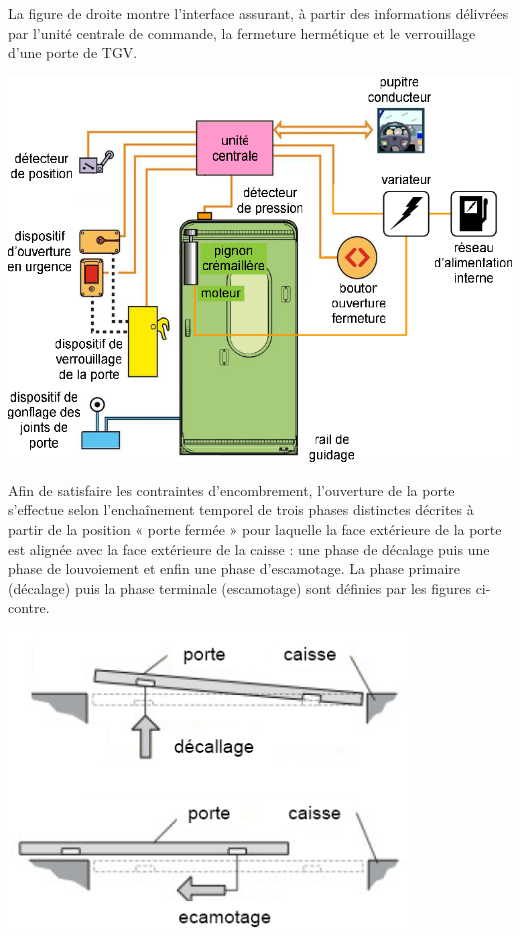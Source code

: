 \documentclass[10pt,fleqn]{article} %
\begin{document}

\vspace{8cm}
\pagestyle{fancy}
\thispagestyle{plain}


\def\columnseprulecolor{\color{ocre}}
\setlength{\columnseprule}{0.4pt} 


\begin{multicols}{2}

 La figure de droite montre l’interface assurant, à partir des informations délivrées par l’unité centrale de commande, la fermeture hermétique et le verrouillage d’une porte de TGV. 
 

\begin{center}
\includegraphics[width=\linewidth]{images/fig_02}
\end{center}


Afin de satisfaire les contraintes d'encombrement, l'ouverture de la porte s'effectue selon l'enchaînement temporel de trois phases distinctes décrites à partir de la position « porte fermée » pour laquelle la face extérieure de la porte est alignée avec la face extérieure de la caisse : une phase de décalage puis une phase de louvoiement et enfin une phase d'escamotage. La phase primaire (décalage) puis la phase terminale (escamotage) sont définies par les figures ci-contre. 

\begin{center}
\includegraphics[width=.8\linewidth]{images/fig_03}
\end{center}



\end{multicols}
\end{document}
